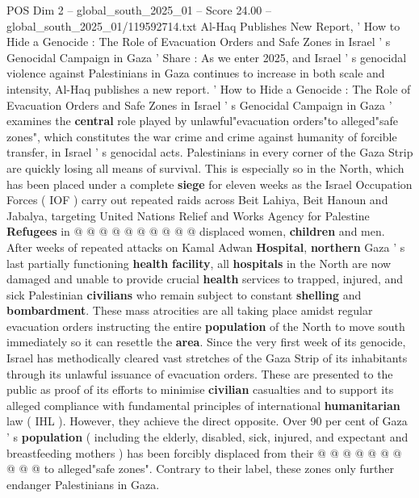 \begin{textsample}{POS Dim 2 – global\_south\_2025\_01 – Score 24.00 – global\_south\_2025\_01/119592714.txt}  \label{ex:f2_pos_319}
Al-Haq Publishes New Report, ' How to Hide a Genocide : The Role of Evacuation Orders and Safe Zones in Israel ' s Genocidal Campaign in Gaza ' Share : As we enter 2025, and Israel ' s genocidal violence against Palestinians in Gaza continues to increase in both scale and intensity, Al-Haq publishes a new report. ' How to Hide a Genocide : The Role of Evacuation Orders and Safe Zones in Israel ' s Genocidal Campaign in Gaza ' examines the \textbf{central} role played by unlawful"evacuation orders"to alleged"safe zones", which constitutes the war crime and crime against humanity of forcible transfer, in Israel ' s genocidal acts.
Palestinians in every corner of the Gaza Strip are quickly losing all means of survival.
This is especially so in the North, which has been placed under a complete \textbf{siege} for eleven weeks as the Israel Occupation Forces ( IOF ) carry out repeated raids across Beit Lahiya, Beit Hanoun and Jabalya, targeting United Nations Relief and Works Agency for Palestine \textbf{Refugees} in @ @ @ @ @ @ @ @ @ @ displaced women, \textbf{children} and men.
After weeks of repeated attacks on Kamal Adwan \textbf{Hospital}, \textbf{northern} Gaza ' s last partially functioning \textbf{health} \textbf{facility}, all \textbf{hospitals} in the North are now damaged and unable to provide crucial \textbf{health} services to trapped, injured, and sick Palestinian \textbf{civilians} who remain subject to constant \textbf{shelling} and \textbf{bombardment}.
These mass atrocities are all taking place amidst regular evacuation orders instructing the entire \textbf{population} of the North to move south immediately so it can resettle the \textbf{area}.
Since the very first week of its genocide, Israel has methodically cleared vast stretches of the Gaza Strip of its inhabitants through its unlawful issuance of evacuation orders.
These are presented to the public as proof of its efforts to minimise \textbf{civilian} casualties and to support its alleged compliance with fundamental principles of international \textbf{humanitarian} law ( IHL ).
However, they achieve the direct opposite.
Over 90 per cent of Gaza ' s \textbf{population} ( including the elderly, disabled, sick, injured, and expectant and breastfeeding mothers ) has been forcibly displaced from their @ @ @ @ @ @ @ @ @ @ to alleged"safe zones".
Contrary to their label, these zones only further endanger Palestinians in Gaza.

\end{textsample}
